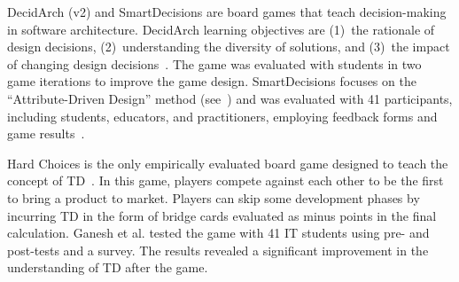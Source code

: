         
        DecidArch (v2) and SmartDecisions are board games that teach decision-making in software architecture.
        DecidArch learning objectives are (1)~the rationale of design decisions, (2)~understanding the diversity of solutions, and (3)~the impact of changing design decisions~\cite{DeBoer2019}. 
        The game was evaluated with students in two game iterations to improve the game design.
        SmartDecisions focuses on the ``Attribute-Driven Design'' method (see~\cite{bass_software_2021}) and was evaluated with 41 participants, including students, educators, and practitioners, employing feedback forms and game results~\cite{cervantes_smart_2016}.
        
        Hard Choices is the only empirically evaluated board game designed to teach the concept of TD~\cite{Ganesh2014}. %
        In this game, players compete against each other to be the first to bring a product to market. %
        Players can skip some development phases by incurring TD in the form of bridge cards evaluated as minus points in the final calculation. 
        Ganesh et al. tested the game with 41 IT students using pre- and post-tests and a survey. 
        The results revealed a significant improvement in the understanding of TD after the game. 

